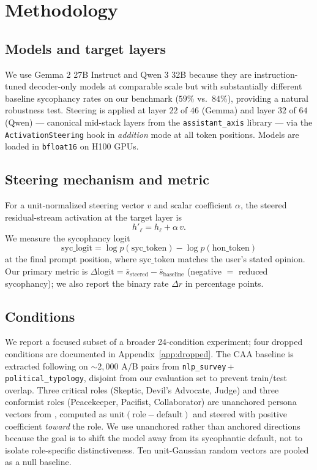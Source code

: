 \documentclass{article}
\theoremstyle{plain}
\theoremstyle{definition}
\theoremstyle{remark}
\begin{document}
\section{Methodology}\label{sec:method}

\subsection{Models and target layers}
We use Gemma 2 27B Instruct \cite{gemma2024} and Qwen 3 32B \cite{qwen2025} because they are instruction-tuned decoder-only models at comparable scale but with substantially different baseline sycophancy rates on our benchmark ($59\%$ vs.~$84\%$), providing a natural robustness test. Steering is applied at layer $22$ of $46$ (Gemma) and layer $32$ of $64$ (Qwen) --- canonical mid-stack layers from the \texttt{assistant\_axis} library \cite{lu2026} --- via the \texttt{ActivationSteering} hook in \emph{addition} mode at all token positions. Models are loaded in \texttt{bfloat16} on H100 GPUs.

\subsection{Steering mechanism and metric}
For a unit-normalized steering vector $v$ and scalar coefficient $\alpha$, the steered residual-stream activation at the target layer is
\begin{equation}\label{eq:steer}
h'_\ell = h_\ell + \alpha\, v.
\end{equation}
We measure the sycophancy logit
\begin{equation}
\mathrm{syc\_logit} = \log p(\mathrm{syc\_token}) - \log p(\mathrm{hon\_token})
\end{equation}
at the final prompt position, where $\mathrm{syc\_token}$ matches the user's stated opinion. Our primary metric is $\Delta\mathrm{logit} = \bar{s}_\mathrm{steered} - \bar{s}_\mathrm{baseline}$ (negative $=$ reduced sycophancy); we also report the binary rate $\Delta r$ in percentage points.

\subsection{Conditions}
We report a focused subset of a broader 24-condition experiment; four dropped conditions are documented in Appendix~\ref{app:dropped}. The CAA baseline is extracted following \citet{rimsky2024} on $\sim\!2{,}000$ A/B pairs from \texttt{nlp\_survey}\,+\,\texttt{political\_typology}, disjoint from our evaluation set to prevent train/test overlap. Three critical roles (Skeptic, Devil's Advocate, Judge) and three conformist roles (Peacekeeper, Pacifist, Collaborator) are unanchored persona vectors from \citet{lu2026}, computed as $\mathrm{unit}(\mathrm{role}-\mathrm{default})$ and steered with positive coefficient \emph{toward} the role. We use unanchored rather than anchored directions because the goal is to shift the model away from its sycophantic default, not to isolate role-specific distinctiveness. Ten unit-Gaussian random vectors are pooled as a null baseline.
\end{document}
